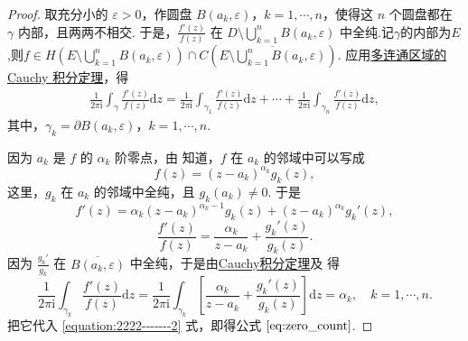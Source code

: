 \documentclass[../../main.tex]{subfiles}%
\begin{document}
\begin{proof} 
取充分小的 \( \varepsilon > 0 \)，作圆盘 \( B(a_k, \varepsilon) \)，\( k = 1, \cdots, n \)，使得这 \( n \) 个圆盘都在 \( \gamma \) 内部，且两两不相交. 于是，\( \frac{f'(z)}{f(z)} \) 在 \( D \setminus \bigcup_{k=1}^{n} B(a_k, \varepsilon) \) 中全纯.记$\gamma$的内部为$E$,则$f\in H\left(E\setminus \bigcup_{k=1}^{n} B(a_k, \varepsilon)\right)\cap C\left(\overline{E\setminus \bigcup_{k=1}^{n} B(a_k, \varepsilon)}\right)$. 应用\hyperref[theorem:定理3.2.5]{多连通区域的 Cauchy 积分定理}，得
\begin{align}
\frac{1}{2\pi \mathrm{i}} \int_{\gamma} \frac{f'(z)}{f(z)} \mathrm{d}z = \frac{1}{2\pi \mathrm{i}} \int_{\gamma_1} \frac{f'(z)}{f(z)} \mathrm{d}z + \cdots + \frac{1}{2\pi \mathrm{i}} \int_{\gamma_n} \frac{f'(z)}{f(z)} \mathrm{d}z, \label{equation:2222-------2}
\end{align}
其中，\( \gamma_k = \partial B(a_k, \varepsilon) \)，\( k = 1, \cdots, n \).

因为 \( a_k \) 是 \( f \) 的 \( \alpha_k \) 阶零点，由 知道，\( f \) 在 \( a_k \) 的邻域中可以写成
\[
f(z) = (z - a_k)^{\alpha_k} g_k(z),
\]
这里，\( g_k \) 在 \( a_k \) 的邻域中全纯，且 \( g_k(a_k) \neq 0 \). 于是
\[
f'(z) = \alpha_k (z - a_k)^{\alpha_k - 1} g_k(z) + (z - a_k)^{\alpha_k} g_k'(z),
\]
\[
\frac{f'(z)}{f(z)} = \frac{\alpha_k}{z - a_k} + \frac{g_k'(z)}{g_k(z)}.
\]
因为 \( \frac{g_k'}{g_k} \) 在 \( \overline{B(a_k, \varepsilon)} \) 中全纯，于是由\hyperref[theorem:Cauchy-Goursat定理(Cauchy积分定理)]{Cauchy积分定理}及 得
\[
\frac{1}{2\pi \mathrm{i}}\int_{\gamma _k}{\frac{f' (z)}{f(z)}\mathrm{d}z}=\frac{1}{2\pi \mathrm{i}}\int_{\gamma _k}{\left[ \frac{\alpha _k}{z-a_k}+\frac{g_k' (z)}{g_k(z)} \right] \mathrm{d}z}=\alpha _k,\quad k=1,\cdots ,n.
\]
把它代入 \eqref{equation:2222-------2} 式，即得公式 \(\eqref{eq:zero_count}\).
\end{proof}
\end{document}
